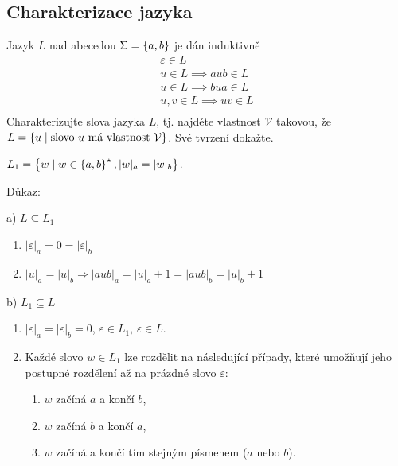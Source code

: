 \subsection{Charakterizace jazyka}
Jazyk $L$ nad abecedou $\Sigma = \left\lbrace a,b \right\rbrace$ je dán induktivně
\begin{gather*}
    \varepsilon \in L \\
    u \in L \implies aub \in L\\
    u \in L \implies bua \in L\\
    u, v \in L \implies uv \in L\\
\end{gather*}
Charakterizujte slova jazyka $L$, tj. najděte vlastnost $\mathcal{V}$ takovou, že $L = \left\lbrace u \mid \text{slovo } u
\text{ má vlastnost } \mathcal{V}  \right\rbrace$. Své tvrzení dokažte.

$L_1 = \left\lbrace w \mid w \in \left\lbrace a,b \right\rbrace^\star, |w|_a=|w|_b \right\rbrace$.

Důkaz:

a) $L \subseteq L_1$

\begin{enumerate}
    \item $|\varepsilon|_a = 0 = |\varepsilon|_b$
    \item $|u|_a = |u|_b \Rightarrow |aub|_a = |u|_a + 1 = |aub|_b = |u|_b + 1$
\end{enumerate}

b) $L_1 \subseteq L$

\begin{enumerate}
    \item $|\varepsilon|_a = |\varepsilon|_b = 0$, $\varepsilon \in L_1$, $\varepsilon \in L$.
    \item Každé slovo $w \in L_1$ lze rozdělit na následující případy, které umožňují jeho postupné rozdělení až na
    prázdné slovo $\varepsilon$:
    \begin{enumerate}[label={}, noitemsep]
        \item {} $w$ začíná $a$ a končí $b$,
        \item {} $w$ začíná $b$ a končí $a$,
        \item {} $w$ začíná a končí tím stejným písmenem ($a$ nebo $b$).
    \end{enumerate}
\end{enumerate}

